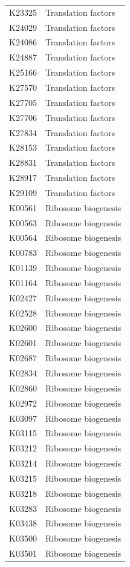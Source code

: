\begin{longtable}{@{}l l@{}}
K23325 & Translation factors \\
K24029 & Translation factors \\
K24086 & Translation factors \\
K24887 & Translation factors \\
K25166 & Translation factors \\
K27570 & Translation factors \\
K27705 & Translation factors \\
K27706 & Translation factors \\
K27834 & Translation factors \\
K28153 & Translation factors \\
K28831 & Translation factors \\
K28917 & Translation factors \\
K29109 & Translation factors \\
K00561 & Ribosome biogenesis \\
K00563 & Ribosome biogenesis \\
K00564 & Ribosome biogenesis \\
K00783 & Ribosome biogenesis \\
K01139 & Ribosome biogenesis \\
K01164 & Ribosome biogenesis \\
K02427 & Ribosome biogenesis \\
K02528 & Ribosome biogenesis \\
K02600 & Ribosome biogenesis \\
K02601 & Ribosome biogenesis \\
K02687 & Ribosome biogenesis \\
K02834 & Ribosome biogenesis \\
K02860 & Ribosome biogenesis \\
K02972 & Ribosome biogenesis \\
K03097 & Ribosome biogenesis \\
K03115 & Ribosome biogenesis \\
K03212 & Ribosome biogenesis \\
K03214 & Ribosome biogenesis \\
K03215 & Ribosome biogenesis \\
K03218 & Ribosome biogenesis \\
K03283 & Ribosome biogenesis \\
K03438 & Ribosome biogenesis \\
K03500 & Ribosome biogenesis \\
K03501 & Ribosome biogenesis \\

\end{longtable}

